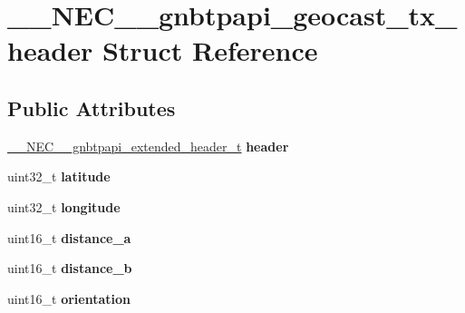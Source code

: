 \hypertarget{struct____NEC____gnbtpapi__geocast__tx__header}{\section{\-\_\-\-\_\-\-N\-E\-C\-\_\-\-\_\-gnbtpapi\-\_\-geocast\-\_\-tx\-\_\-header \-Struct \-Reference}
\label{struct____NEC____gnbtpapi__geocast__tx__header}
}
\subsection*{\-Public \-Attributes}
\begin{DoxyCompactItemize}
\item 
\hypertarget{struct____NEC____gnbtpapi__geocast__tx__header_a5c659546ab0c2787b8640320291a1be8}{\hyperlink{struct____NEC____gnbtpapi__extended__header}{\-\_\-\-\_\-\-N\-E\-C\-\_\-\-\_\-gnbtpapi\-\_\-extended\-\_\-header\-\_\-t} {\bfseries header}}\label{struct____NEC____gnbtpapi__geocast__tx__header_a5c659546ab0c2787b8640320291a1be8}

\item 
\hypertarget{struct____NEC____gnbtpapi__geocast__tx__header_a863ff1f1a3a2618d8ab306f577435bde}{uint32\-\_\-t {\bfseries latitude}}\label{struct____NEC____gnbtpapi__geocast__tx__header_a863ff1f1a3a2618d8ab306f577435bde}

\item 
\hypertarget{struct____NEC____gnbtpapi__geocast__tx__header_a9aa164e4d387ea03638d23a46189937e}{uint32\-\_\-t {\bfseries longitude}}\label{struct____NEC____gnbtpapi__geocast__tx__header_a9aa164e4d387ea03638d23a46189937e}

\item 
\hypertarget{struct____NEC____gnbtpapi__geocast__tx__header_a7950b4c69b4d681112099ff5415cf327}{uint16\-\_\-t {\bfseries distance\-\_\-a}}\label{struct____NEC____gnbtpapi__geocast__tx__header_a7950b4c69b4d681112099ff5415cf327}

\item 
\hypertarget{struct____NEC____gnbtpapi__geocast__tx__header_ac16596944807eef7e14d152da5b83212}{uint16\-\_\-t {\bfseries distance\-\_\-b}}\label{struct____NEC____gnbtpapi__geocast__tx__header_ac16596944807eef7e14d152da5b83212}

\item 
\hypertarget{struct____NEC____gnbtpapi__geocast__tx__header_a275b6ce832c6c970283629dadd10c084}{uint16\-\_\-t {\bfseries orientation}}\label{struct____NEC____gnbtpapi__geocast__tx__header_a275b6ce832c6c970283629dadd10c084}


\end{DoxyCompactItemize}
